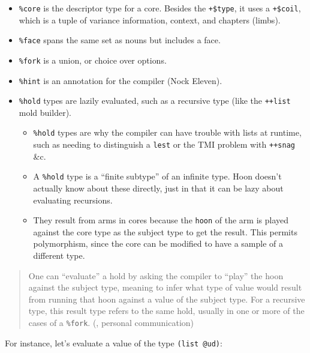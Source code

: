 \documentclass[twoside]{article}
\begin{document}
\begin{itemize}
  \item  \lstinline[style=inlinecode]{%core} is the descriptor type for a core.  Besides the \lstinline[style=inlinecode]{+$type}, it uses a \lstinline[style=inlinecode]{+$coil}, which is a tuple of variance information, context, and chapters (limbs).
  \item  \lstinline[style=inlinecode]{%face} spans the same set as nouns but includes a face.
  \item  \lstinline[style=inlinecode]{%fork} is a union, or choice over options.
  \item  \lstinline[style=inlinecode]{%hint} is an annotation for the compiler (Nock Eleven).
  \item  \lstinline[style=inlinecode]{%hold} types are lazily evaluated, such as a recursive type (like the \lstinline[style=inlinecode]{++list} mold builder).
  \begin{itemize}
    \item  \lstinline[style=inlinecode]{%hold} types are why the compiler can have trouble with lists at runtime, such as needing to distinguish a \lstinline[style=inlinecode]{lest} or the TMI problem with \lstinline[style=inlinecode]{++snag} \&c.
    \item  A \lstinline[style=inlinecode]{%hold} type is a “finite subtype” of an infinite type.  Hoon doesn't actually know about these directly, just in that it can be lazy about evaluating recursions.
    \item  They result from arms in cores because the \lstinline[style=inlinecode]{hoon} of the arm is played against the core type as the subject type to get the result.  This permits polymorphism, since the core can be modified to have a sample of a different type.
  \end{itemize}
\end{itemize}

\noindent
\begin{quote}
One can “evaluate” a hold by asking the compiler to “play” the hoon against the subject type, meaning to infer what type of value would result from running that hoon against a value of the subject type. For a recursive type, this result type refers to the same hold, usually in one or more of the cases of a \lstinline[style=inlinecode]{%fork}.  (, personal communication)
\end{quote}

For instance, let's evaluate a value of the type \lstinline[style=inlinecode]{(list @ud)}:
\end{document}
